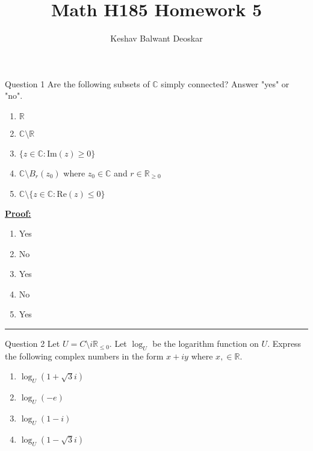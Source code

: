\documentclass{article}
\title{Math H185 Homework 5}
\author{Keshav Balwant Deoskar}
\newcommand{\R}{\mathbb{R}}
\newcommand{\C}{\mathbb{C}}
\begin{document}
\maketitle


\begin{mathdefinitionbox}{Question 1}
\vskip 0.5cm
Are the following subsets of $\C$ simply connected? Answer "yes" or "no".
\begin{enumerate}[label=(\alph*)]
  \item $\R$
  \item $\C \setminus \R$
  \item $\{ z \in \C : \text{Im}(z) \geq 0 \}$
  \item $\C \setminus B_r(z_0)$ where $z_0 \in \C$ and $r \in \R_{\geq 0}$
  \item $\C \setminus \{ z \in \C : \text{Re}(z) \leq 0 \}$
\end{enumerate}
\end{mathdefinitionbox}

\vskip 0.5cm
\underline{\textbf{Proof:}}


\begin{enumerate}[label=(\alph*)]
  \item Yes  
  \item No
  \item Yes 
  \item No 
  \item Yes
\end{enumerate}

\vskip 0.5cm
\hrule 
\vskip 0.5cm


\begin{mathdefinitionbox}{Question 2}
\vskip 0.5cm
Let $U = C \setminus i\R_{\leq 0}$. Let $\log_U$ be the logarithm function on $U$. Express the following complex numbers in the form $x + iy$ where $x, \in \R$.
\begin{enumerate}[label=(\alph*)]
  \item $\log_{U} (1 + \sqrt{3}i)$
  \item $\log_{U} (-e)$
  \item $\log_{U} (1 - i)$
  \item $\log_{U} (1 - \sqrt{3}i)$
\end{enumerate}
\end{mathdefinitionbox}
\end{document}
